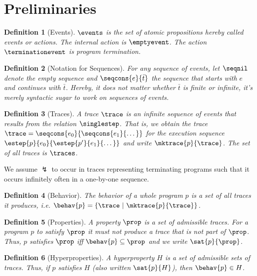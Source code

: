 \documentclass[a4paper,names,dvipsnames]{article}
\newtheorem{definition}{Definition}
\begin{document}
\tableofcontents
\printglossaries
\clearpage

\section{Preliminaries}

\begin{definition}[Events]\label{def:events}
  $\events$ is the set of atomic propositions hereby called events or actions.
  The internal action is $\emptyevent$.
  The action $\terminationevent$ is program termination.
\end{definition}

\begin{definition}[Notation for Sequences]
  For any sequence of events, let $\seqnil$ denote the empty sequence and $\seqcons{e}{\bar{t}}$ the sequence that starts with $e$ and continues with $\bar{t}$.
  Hereby, it does not matter whether $\bar{t}$ is finite or infinite, it's merely syntactic sugar to work on sequences of events.
\end{definition}

\begin{definition}[Traces]
  A trace $\trace$ is an infinite sequence of events that results from the relation $\singlestep$.
  That is, we obtain the trace $\trace=\seqcons{e_{0}}{\seqcons{e_{1}}{\dots}}$ for the execution sequence $\estep{p}{e_{0}}{\estep{p'}{e_{1}}{\dots}}$ and write $\mktrace{p}{\trace}$.
  The set of all traces is $\traces$.
\end{definition}
\noindent
We assume $\lightning$ to occur in traces representing terminating programs such that it occurs infinitely often in a one-by-one sequence.

\begin{definition}[Behavior]
  The behavior of a whole program $p$ is a set of all traces it produces, i.e. $\behav{p}=\{\trace\ |\ \mktrace{p}{\trace}\}$.
\end{definition}

\begin{definition}[Properties]
  A property $\prop$ is a set of admissible traces. For a program $p$ to satisfy $\prop$ it must not produce a trace that is not part of $\prop$. Thus, $p$ satisfies $\prop$ iff $\behav{p}\subseteq\prop$ and we write $\sat{p}{\prop}$.
\end{definition}

\begin{definition}[Hyperproperties]
  A hyperproperty $H$ is a set of admissible sets of traces. Thus, if $p$ satisfies $H$ (also written $\sat{p}{H}$), then $\behav{p}\in H$.
\end{definition}
\end{document}

